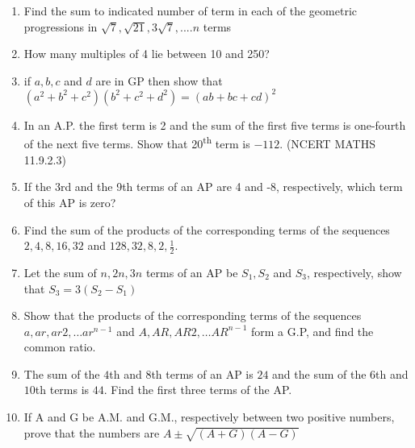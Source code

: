 \begin{enumerate}[label=\thesection.\arabic*,ref=\thesection.\theenumi]
\item Find the sum to indicated number of term in each of the geometric progressions in $\sqrt{7} ,\sqrt{21} , 3\sqrt{7}, ....n$ terms\\
\solution


\item How many multiples of 4 lie between 10 and 250?\\
\solution
\pagebreak

\item if $a,b,c$ and $d$ are in GP then show that $(a^{2}+b^{2}+c^{2})(b^{2}+c^{2}+d^{2})=(ab+bc+cd)^{2}$\\
\solution
\pagebreak

\item In an A.P. the first term is 2 and the sum of the first five terms is one-fourth of the next five terms. Show that 20\textsuperscript{th} term is $-112$. \hfill(NCERT MATHS 11.9.2.3)\\
\solution

\pagebreak
\item If the 3rd and the 9th terms of an AP are 4 and -8, respectively, which term of this AP is zero? \\
\solution

\pagebreak
\item Find the sum of the products of the corresponding terms of the sequences $2, 4, 8, 16, 32$ and $128, 32, 8, 2, \frac{1}{2}$.
\solution
\pagebreak

\item Let the sum of $n,2n,3n$ terms of an AP be $S_1,S_2$ and $S_3$, respectively, show that $S_3=3(S_2-S_1)$\\
\solution

\pagebreak

\item Show that the products of the corresponding terms of the sequences $a, ar, ar2, \ldots ar^{n-1}$ and $A, AR, AR2, \ldots AR^{n-1}$ form a G.P, and find the common ratio.
\solution

\pagebreak

\item
The sum of the $4$th and $8$th terms of an AP is $24$ and the sum of the $6$th and $10$th terms is $44$. Find the first three terms of the AP.\\
\solution

\newpage

\item
If A and G be A.M. and G.M., respectively between two positive numbers, prove that the numbers are $A \pm \sqrt{(A+G)(A-G)}$\\
\solution
\newpage


\end{enumerate}
